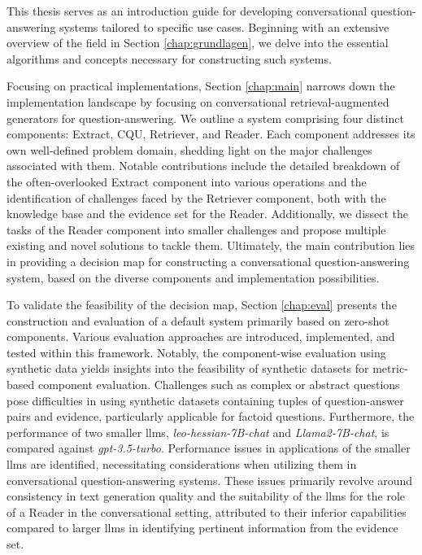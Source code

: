 This thesis serves as an introduction guide for developing conversational question-answering systems tailored to specific use cases. Beginning with an extensive overview of the field in Section \ref{chap:grundlagen}, we delve into the essential algorithms and concepts necessary for constructing such systems.

Focusing on practical implementations, Section \ref{chap:main} narrows down the implementation landscape by focusing on conversational retrieval-augmented generators for question-answering. We outline a system comprising four distinct components: Extract, CQU, Retriever, and Reader. Each component addresses its own well-defined problem domain, shedding light on the major challenges associated with them. Notable contributions include the detailed breakdown of the often-overlooked Extract component into various operations and the identification of challenges faced by the Retriever component, both with the knowledge base and the evidence set for the Reader. Additionally, we dissect the tasks of the Reader component into smaller challenges and propose multiple existing and novel solutions to tackle them. Ultimately, the main contribution lies in providing a decision map for constructing a conversational question-answering system, based on the diverse components and implementation possibilities.

To validate the feasibility of the decision map, Section \ref{chap:eval} presents the construction and evaluation of a default system primarily based on zero-shot components. Various evaluation approaches are introduced, implemented, and tested within this framework. Notably, the component-wise evaluation using synthetic data yields insights into the feasibility of synthetic datasets for metric-based component evaluation. Challenges such as complex or abstract questions pose difficulties in using synthetic datasets containing tuples of question-answer pairs and evidence, particularly applicable for factoid questions. Furthermore, the performance of two smaller \gls{llm}s, \textit{leo-hessian-7B-chat} and \textit{Llama2-7B-chat}, is compared against \textit{gpt-3.5-turbo}. Performance issues in applications of the smaller \gls{llm}s are identified, necessitating considerations when utilizing them in conversational question-answering systems. These issues primarily revolve around consistency in text generation quality and the suitability of the \gls{llm}s for the role of a Reader in the conversational setting, attributed to their inferior capabilities compared to larger \gls{llm}s in identifying pertinent information from the evidence set.

